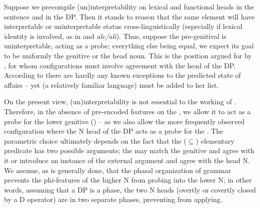 \documentclass[output=paper]{langsci/langscibook}
\begin{document}
Suppose we precompile (un)interpretability on lexical and functional heads in the sentence and in the DP. Then it stands to reason that the same element will have interpretable or uninterpretable status cross-linguistically (especially if lexical identity is involved, as in  and  \textit{ale\slash ali}). Thus, suppose the pre-genitival  is uninterpretable, acting as a probe; everything else being equal, we expect its goal to be uniformly the genitive or the head noun. This is the position argued for by \citet{Philip2012}, for whom  configurations must involve agreement with the head of the DP. According to \citet{Philip2012} there are hardly any known exceptions to the predicted state of affairs – yet  (a relatively familiar language) must be added to her list. 

  On the present view, (un)interpretability is not essential to the working of . Therefore, in the absence of pre-encoded features on the , we allow it to act as a probe for the lower genitive () – as we also allow the more frequently observed configuration where the N head of the DP acts as a probe for the . The parametric choice ultimately depends on the fact that the ($\subseteq$) elementary predicate has two possible arguments; the  may match the genitive and agree with it or introduce an instance of the external argument and agree with the head N. We assume, as is generally done, that the phasal organization of grammar prevents the phi-features of the higher N from probing into the lower N; in other words, assuming that a DP is a phase, the two N heads (overtly or covertly closed by a D operator) are in two separate phases, preventing  from applying.  
\end{document}
